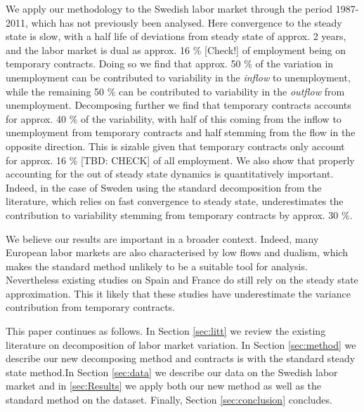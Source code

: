 We apply our methodology to the Swedish labor market through the period 1987-2011, which has not previously been analysed. Here convergence to the steady state is slow, with a half life of deviations from steady state of approx. 2 years, and the labor market is dual as approx. 16 \% [Check!] of employment being on temporary contracts. Doing so we find that approx. 50 \% of the variation in unemployment can be contributed to variability in the \emph{inflow} to unemployment, while the remaining 50 \% can be contributed to variability in the \emph{outflow} from unemployment. Decomposing further we find that temporary contracts accounts for approx. 40 \% of the variability, with half of this coming from the inflow to unemployment from temporary contracts and half stemming from the flow in the opposite direction. This is sizable given that temporary contracts only account for approx. 16 \% [TBD: CHECK] of all employment. We also show that properly accounting for the out of steady state dynamics is quantitatively important. Indeed, in the case of Sweden using the standard decomposition from the literature, which relies on fast convergence to steady state, underestimates the contribution to variability stemming from temporary contracts by approx. 30 \%. 

We believe our results are important in a broader context. Indeed, many European labor markets are also characterised by low flows and dualism, which makes the standard method unlikely to be a suitable tool for analysis. Nevertheless existing studies on Spain and France \citep{Silva2013, Hairault2015} do still rely on the steady state approximation. This it likely that these studies have underestimate the variance contribution from temporary contracts.

This paper continues as follows. In Section \ref{sec:litt} we review the existing literature on decomposition of labor market variation. In Section \ref{sec:method} we describe our new decomposing method and contracts is with the standard steady state method.In Section \ref{sec:data} we describe our data on the Swedish labor market and in \ref{sec:Results} we apply both our new method as well as the standard method on the dataset. Finally, Section \ref{sec:conclusion} concludes.
